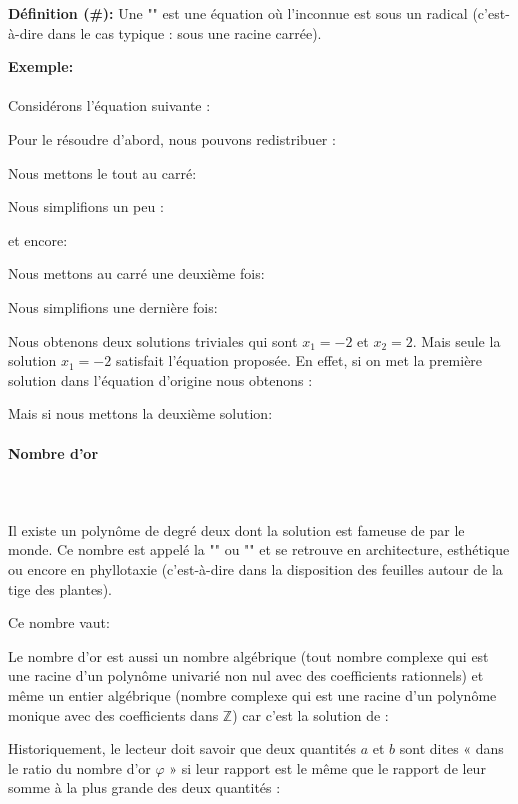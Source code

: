 	\textbf{Définition  (\#\mydef):} Une "" est une équation où l'inconnue est sous un radical (c'est-à-dire dans le cas typique : sous une racine carrée).
	
	\begin{tcolorbox}[colframe=black,colback=white,sharp corners]
	\textbf{{\Large {}}Exemple:}\\\\
	Considérons l'équation suivante :
	
	Pour le résoudre d'abord, nous pouvons redistribuer :
	
	Nous mettons le tout au carré:
	
	Nous simplifions un peu :
	
	et encore:
	
	Nous mettons au carré une deuxième fois:
	
	Nous simplifions une dernière fois:
	
	Nous obtenons deux solutions triviales qui sont $ x_1 = -2 $ et $ x_2 = 2 $. Mais seule la solution $ x_1 = -2 $ satisfait l'équation proposée. En effet, si on met la première solution dans l'équation d'origine nous obtenons :
	
	Mais si nous mettons la deuxième solution:
		
	\end{tcolorbox}
	
	\pagebreak
	\paragraph{Nombre d'or}\mbox{}\\\\
	Il existe un polynôme de degré deux dont la solution est fameuse de par le monde. Ce nombre est appelé la "\label{golden ratio}" ou "" et se retrouve en architecture, esthétique ou encore en phyllotaxie (c'est-à-dire dans la disposition des feuilles autour de la tige des plantes).
	
	Ce nombre vaut: 
	
	Le nombre d'or est aussi un nombre algébrique (tout nombre complexe qui est une racine d'un polynôme univarié non nul avec des coefficients rationnels) et même un entier algébrique (nombre complexe qui est une racine d'un polynôme monique avec des coefficients dans $\mathbb{Z}$) car c'est la solution de :
	
	Historiquement, le lecteur doit savoir que deux quantités $a$ et $b$ sont dites « dans le ratio du nombre d'or $\varphi$ » si leur rapport est le même que le rapport de leur somme à la plus grande des deux quantités :
	
